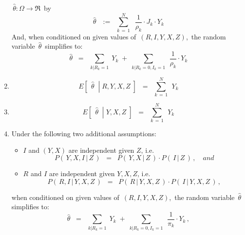 \begin{proposition}
\begin{enumerate}
	\,$\widehat{\theta} : \Omega \longrightarrow \Re$\,
	by
	\begin{equation*}
	\widehat{\theta}
	\,\;\; := \;\;
		\overset{N}{\underset{k\,=\,1}{\sum}}\;\;
		\dfrac{1}{\rho_{k}} \cdot J_{k} \cdot Y_{k}
	\end{equation*}
	And, when conditioned on given values of \,$(R,I,Y,X,Z)$,\,
	the random variable \,$\widehat{\theta}$\, simplifies to:
	\begin{equation*}
	\widehat{\theta}
	\;\; = \;\;
		\underset{k\vert R_{k}=1}{\sum}\; Y_{k}
		\; + \;
		\underset{k\vert R_{k}=0,I_{k}=1}{\sum}\;\, \dfrac{1}{\rho_{k}}\cdot Y_{k}
	\end{equation*}
\item
	\begin{equation*}
	E\!\left[\;\,\left.\widehat{\theta}\;\;\right\vert\;R,Y,X,Z\;\right]
	\;\; = \;\;
		\overset{N}{\underset{k\,=\,1}{\sum}}\;\, Y_{k}	
	\end{equation*}
\item
	\begin{equation*}
	E\!\left[\;\,\left.\widehat{\theta}\;\;\right\vert\;Y,X,Z\;\right]
	\;\; = \;\;
		\overset{N}{\underset{k\,=\,1}{\sum}}\;\, Y_{k}	
	\end{equation*}
\item
	Under the following two additional assumptions:
	\begin{itemize}
	\item
		$I$ and $(Y,X)$ are independent given $Z$, i.e.
		\begin{equation*}
		P\!\left(\,Y,X,I\,\vert\,Z\,\right)
		\;\; = \;\;
			P\!\left(\,Y,X\,\vert\,Z\,\right)
			\cdot
			P\!\left(\,I\,\vert\,Z\,\right)\,,
			\quad
			\textit{and}
		\end{equation*}
	\item
		$R$ and $I$ are independent given $Y,X,Z$, i.e.
		\begin{equation*}
		P\!\left(\,R,I\,\vert\,Y,X,Z\,\right)
		\;\; = \;\;
			P\!\left(\,R\,\vert\,Y,X,Z\,\right)
			\cdot
			P\!\left(\,I\,\vert\,Y,X,Z\,\right)\,,
		\end{equation*}	
	\end{itemize}
	when conditioned on given values of \,$(R,I,Y,X,Z)$,\, the random variable \,$\widehat{\theta}$\, simplifies to:
	\begin{equation*}
	\widehat{\theta}
	\;\; = \;\;
		\underset{k\vert R_{k}=1}{\sum}\; Y_{k}
		\; + \;
		\underset{k\vert R_{k}=0,I_{k}=1}{\sum}\;\, \dfrac{1}{\pi_{k}}\cdot Y_{k}\,,
	\end{equation*}

\end{enumerate}
\end{proposition}
